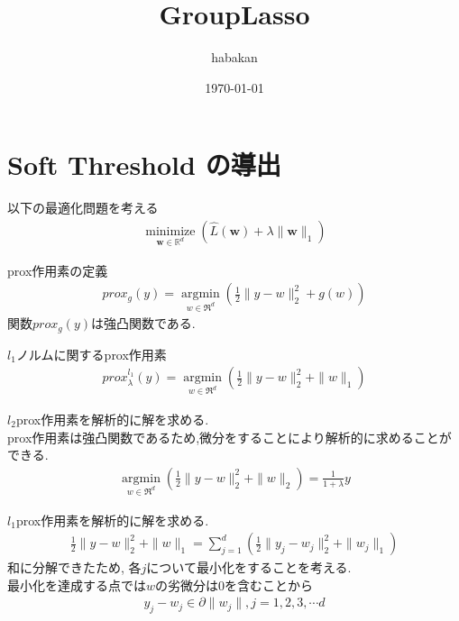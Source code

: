 \documentclass[dvipdfmx]{beamer}
\begin{document}
\title{GroupLasso}
\author{habakan}
\date{\today}

\begin{frame}                  
\titlepage                     
\end{frame}

\begin{frame}                  
\tableofcontents
\end{frame}

\section{Soft Threshold の導出}             

\begin{frame}
    以下の最適化問題を考える
    \begin{eqnarray}
        \underset{\boldsymbol{w} \in \mathbb{R}^{d}}{\operatorname{minimize}}\left(\hat{L}(\boldsymbol{w})+\lambda\|\boldsymbol{w}\|_{1}\right)
    \end{eqnarray}
\end{frame}

\begin{frame}
    prox作用素の定義
    \begin{eqnarray}
        prox_g(y) = \underset{w \in \mathfrak{R}^{d}}{ \operatorname{argmin}} \left( \frac{1}{2} \| y - w \|_{2}^{2} + g(w) \right)
    \end{eqnarray}
    関数$prox_g(y)$は強凸関数である.

    $l_1$ノルムに関するprox作用素
    \begin{eqnarray}
        prox_{\lambda}^{l_1}(y) = \underset{w \in \mathfrak{R}^{d}}{ \operatorname{argmin}} \left( \frac{1}{2} \| y - w \|_{2}^{2} + \|w\|_1 \right)
    \end{eqnarray}
\end{frame}

\begin{frame}
    $l_2$prox作用素を解析的に解を求める. \\
    prox作用素は強凸関数であるため,微分をすることにより解析的に求めることができる. 
    \begin{eqnarray}
        \underset{w \in \mathfrak{R}^{d}}{ \operatorname{argmin}} \left( \frac{1}{2} \| y - w \|_{2}^{2} + \|w\|_2 \right) = \frac{1}{1+\lambda} y
    \end{eqnarray}
\end{frame}

\begin{frame}
    $l_1$prox作用素を解析的に解を求める. \\
    \begin{eqnarray}
        \frac{1}{2} \| y - w \|_{2}^{2} + \|w\|_1 = \sum_{j = 1}^{d} \left( \frac{1}{2} \| y_j - w_j \|_{2}^{2} + \|w_j\|_1 \right)
    \end{eqnarray}
    和に分解できたため, 各$j$について最小化をすることを考える. \\
    最小化を達成する点では$w$の劣微分は$0$を含むことから
    \begin{eqnarray}
        y_j - w_j \in \partial \|w_j\|, j = 1, 2, 3, \cdots d
    \end{eqnarray}
\end{frame}
\end{document}
